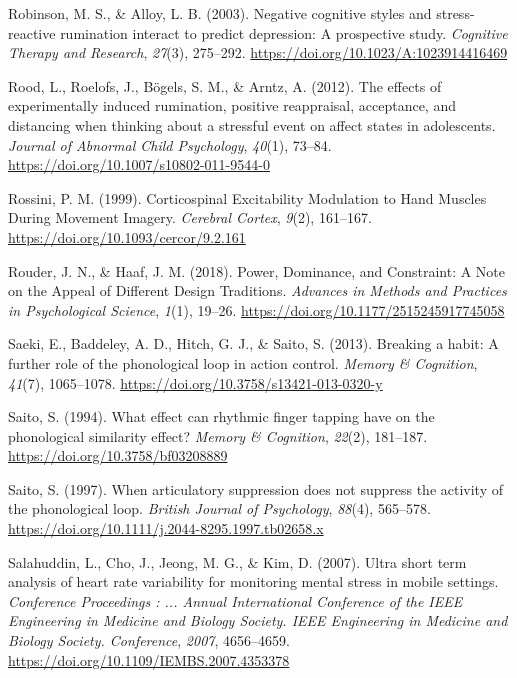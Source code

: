 \documentclass[a4paper,12pt,twoside,openright,oldfontcommands,final]{memoir}
\begin{document}
\leavevmode\hypertarget{ref-Robinson2003}{}%
Robinson, M. S., \& Alloy, L. B. (2003). Negative cognitive styles and stress-reactive rumination interact to predict depression: A prospective study. \emph{Cognitive Therapy and Research}, \emph{27}(3), 275--292. \url{https://doi.org/10.1023/A:1023914416469}

\leavevmode\hypertarget{ref-Rood2012}{}%
Rood, L., Roelofs, J., Bögels, S. M., \& Arntz, A. (2012). The effects of experimentally induced rumination, positive reappraisal, acceptance, and distancing when thinking about a stressful event on affect states in adolescents. \emph{Journal of Abnormal Child Psychology}, \emph{40}(1), 73--84. \url{https://doi.org/10.1007/s10802-011-9544-0}

\leavevmode\hypertarget{ref-rossini_corticospinal_1999}{}%
Rossini, P. M. (1999). Corticospinal Excitability Modulation to Hand Muscles During Movement Imagery. \emph{Cerebral Cortex}, \emph{9}(2), 161--167. \url{https://doi.org/10.1093/cercor/9.2.161}

\leavevmode\hypertarget{ref-rouder_power_2018}{}%
Rouder, J. N., \& Haaf, J. M. (2018). Power, Dominance, and Constraint: A Note on the Appeal of Different Design Traditions. \emph{Advances in Methods and Practices in Psychological Science}, \emph{1}(1), 19--26. \url{https://doi.org/10.1177/2515245917745058}

\leavevmode\hypertarget{ref-saeki_breaking_2013}{}%
Saeki, E., Baddeley, A. D., Hitch, G. J., \& Saito, S. (2013). Breaking a habit: A further role of the phonological loop in action control. \emph{Memory \& Cognition}, \emph{41}(7), 1065--1078. \url{https://doi.org/10.3758/s13421-013-0320-y}

\leavevmode\hypertarget{ref-saito_what_1994}{}%
Saito, S. (1994). What effect can rhythmic finger tapping have on the phonological similarity effect? \emph{Memory \& Cognition}, \emph{22}(2), 181--187. \url{https://doi.org/10.3758/bf03208889}

\leavevmode\hypertarget{ref-saito_when_1997}{}%
Saito, S. (1997). When articulatory suppression does not suppress the activity of the phonological loop. \emph{British Journal of Psychology}, \emph{88}(4), 565--578. \url{https://doi.org/10.1111/j.2044-8295.1997.tb02658.x}

\leavevmode\hypertarget{ref-Salahuddin2007}{}%
Salahuddin, L., Cho, J., Jeong, M. G., \& Kim, D. (2007). Ultra short term analysis of heart rate variability for monitoring mental stress in mobile settings. \emph{Conference Proceedings : ... Annual International Conference of the IEEE Engineering in Medicine and Biology Society. IEEE Engineering in Medicine and Biology Society. Conference}, \emph{2007}, 4656--4659. \url{https://doi.org/10.1109/IEMBS.2007.4353378}
\end{document}
